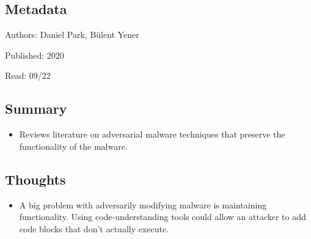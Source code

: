 \documentclass{article}
\begin{document}
\subsection*{Metadata}

\noindent Authors: Daniel Park, Bülent Yener

\noindent Published: 2020

\noindent Read: 09/22

\subsection*{Summary}
\begin{itemize}
	\item Reviews literature on adversarial malware techniques that preserve the functionality of the malware.
\end{itemize}

\subsection*{Thoughts}
\begin{itemize}
\item A big problem with adversarily modifying malware is maintaining functionality. Using code-understanding tools could allow an attacker to add code blocks that don't actually execute.
\end{itemize}
\end{document}
